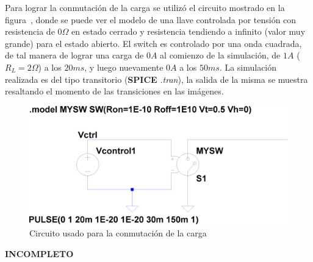 
\vspace{1.5cm}

Para lograr la conmutación de la carga se utilizó el circuito mostrado en la figura~, donde se puede ver el modelo de una llave controlada por tensión con resistencia de $0 \Omega$ en estado cerrado y resistencia tendiendo a infinito (valor muy grande) para el estado abierto. El switch es controlado por una onda cuadrada, de tal manera de lograr una carga de $0 A$ al comienzo de la simulación, de $1 A$ ($R_{L} = 2 \Omega$) a los $20 ms$, y luego nuevamente $0 A$ a los $50 ms$. La simulación realizada es del tipo transitorio (\textbf{SPICE} \textit{.tran}), la salida de la misma se muestra resaltando el momento de las transiciones en las imágenes.



\begin{figure}[H] %
\begin{center}
\includegraphics[width=0.9 \textwidth, angle=0]{./img/preguntas/p16a.png}
\caption{\label{fig:fig_p16_rl_switch}\footnotesize{Circuito usado para la conmutación de la carga}}
\end{center}
\end{figure}



\textbf{INCOMPLETO}

\vfill

\clearpage
